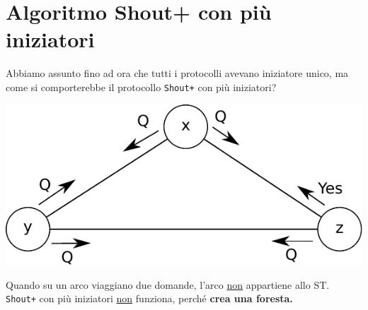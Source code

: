 \section{Algoritmo Shout+ con più iniziatori}
Abbiamo assunto fino ad ora che tutti i protocolli avevano iniziatore unico, ma come si comporterebbe il protocollo \texttt{Shout+} con più iniziatori?
\begin{center}
  \includegraphics[scale=0.8]{images/n_36}
\end{center}
Quando su un arco viaggiano due domande, l'arco \underline{non} appartiene allo ST. \\
\texttt{Shout+} con più iniziatori \underline{non} funziona, perché \textbf{crea una foresta.}


